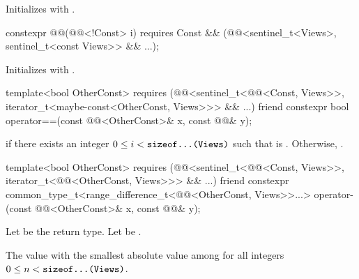 \begin{itemdescr}
\pnum
\effects
Initializes  with .
\end{itemdescr}

%
\begin{itemdecl}
constexpr @@(@@<!Const> i)
  requires Const && (@@<sentinel_t<Views>, sentinel_t<const Views>> && ...);
\end{itemdecl}

\begin{itemdescr}
\pnum
\effects
Initializes  with .
\end{itemdescr}

%
\begin{itemdecl}
template<bool OtherConst>
  requires (@@<sentinel_t<@@<Const, Views>>,
                         iterator_t<maybe-const<OtherConst, Views>>> && ...)
friend constexpr bool operator==(const @@<OtherConst>& x, const @@& y);
\end{itemdecl}

\begin{itemdescr}
\pnum
\returns
{} if there exists an integer $0 \leq i < \tcode{sizeof...(Views)}$
such that  is .
Otherwise, .
\end{itemdescr}

%
\begin{itemdecl}
template<bool OtherConst>
  requires (@@<sentinel_t<@@<Const, Views>>,
                               iterator_t<@@<OtherConst, Views>>> && ...)
friend constexpr common_type_t<range_difference_t<@@<OtherConst, Views>>...>
  operator-(const @@<OtherConst>& x, const @@& y);
\end{itemdecl}

\begin{itemdescr}
\pnum
Let  be the return type.
Let  be
.

\pnum
\returns
The value with the smallest absolute value among 
for all integers $0 \leq n < \tcode{sizeof...(Views)}$.
\end{itemdescr}

